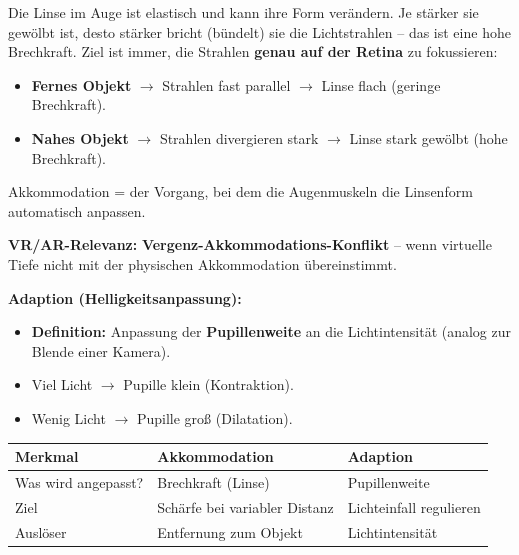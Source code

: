\documentclass[12pt, a4paper]{article}
\begin{document}
\begin{notebox}[title={Was ist Brechkraft der Linse?}]
  Die Linse im Auge ist elastisch und kann ihre Form verändern. Je stärker sie
  gewölbt ist, desto stärker bricht (bündelt) sie die Lichtstrahlen -- das ist
  eine hohe Brechkraft. Ziel ist immer, die Strahlen \textbf{genau auf der Retina}
  zu fokussieren:
  \begin{itemize}[noitemsep]
    \item \textbf{Fernes Objekt} $\rightarrow$ Strahlen fast parallel $\rightarrow$
          Linse flach (geringe Brechkraft).
    \item \textbf{Nahes Objekt} $\rightarrow$ Strahlen divergieren stark $\rightarrow$
          Linse stark gewölbt (hohe Brechkraft).
  \end{itemize}
  Akkommodation = der Vorgang, bei dem die Augenmuskeln die Linsenform automatisch
  anpassen.
\end{notebox}

\begin{notebox}
  \textbf{VR/AR-Relevanz:} \textbf{Vergenz-Akkommodations-Konflikt} -- wenn virtuelle
  Tiefe nicht mit der physischen Akkommodation übereinstimmt.
\end{notebox}

\textbf{Adaption (Helligkeitsanpassung):}
\begin{itemize}
  \item \textbf{Definition:} Anpassung der \textbf{Pupillenweite} an die
        Lichtintensität (analog zur Blende einer Kamera).
  \item Viel Licht $\rightarrow$ Pupille klein (Kontraktion).
  \item Wenig Licht $\rightarrow$ Pupille groß (Dilatation).
\end{itemize}

\begin{center}
\begin{tabular}{p{3cm} p{5cm} p{5cm}}
\hline
\textbf{Merkmal} & \textbf{Akkommodation} & \textbf{Adaption} \\
\hline
Was wird angepasst? & Brechkraft (Linse)            & Pupillenweite \\[3pt]
Ziel                & Schärfe bei variabler Distanz & Lichteinfall regulieren \\[3pt]
Auslöser            & Entfernung zum Objekt         & Lichtintensität \\
\hline
\end{tabular}
\end{center}
\end{document}
